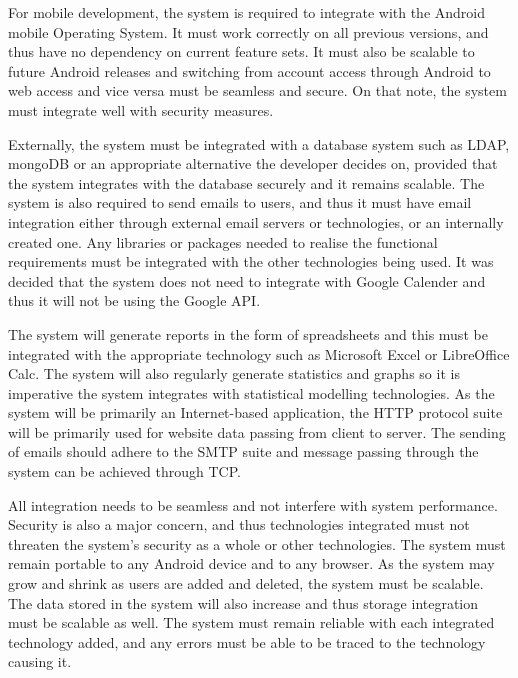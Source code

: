 \documentclass[a4paper,12pt]{article}
\begin{document}
For mobile development, the system is required to integrate with the Android mobile Operating System. It must work correctly on all previous versions, and thus have no dependency on current feature sets. It must also be scalable to future Android releases and switching from account access through Android to web access and vice versa must be seamless and secure. On that note, the system must integrate well with security measures.

Externally, the system must be integrated with a database system such as LDAP, mongoDB or an appropriate alternative the developer decides on, provided that the system integrates with the database securely and it remains scalable. The system is also required to send emails to users, and thus it must have email integration either through external email servers or technologies, or an internally created one. Any libraries or packages needed to realise the functional requirements must be integrated with the other technologies being used. It was decided that the system does not need to integrate with Google Calender and thus it will not be using the Google API.

The system will generate reports in the form of spreadsheets and this must be integrated with the appropriate technology such as Microsoft Excel or LibreOffice Calc. The system will also regularly generate statistics and graphs so it is imperative the system integrates with statistical modelling technologies. As the system will be primarily an Internet-based application, the HTTP protocol suite will be primarily used for website data passing from client to server. The sending of emails should adhere to the SMTP suite and message passing through the system can be achieved through TCP. 

All integration needs to be seamless and not interfere with system performance. Security is also a major concern, and thus technologies integrated must not threaten the system's security as a whole or other technologies. The system must remain portable to any Android device and to any browser. As the system may grow and shrink as users are added and deleted, the system must be scalable. The data stored in the system will also increase and thus storage integration must be scalable as well. The system must remain reliable with each integrated technology added, and any errors must be able to be traced to the technology causing it.

\end{document}
